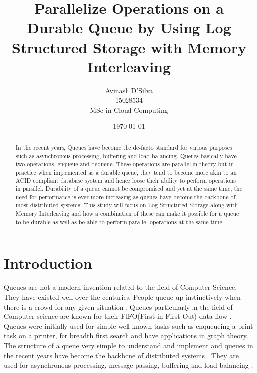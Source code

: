 \documentclass[12pt,a4paper]{article}
\begin{document}
\title{Parallelize Operations on a Durable Queue by Using Log Structured Storage with Memory Interleaving}%
\author{Avinash D'Silva \\ 15028534 \\ MSc in Cloud Computing}%
\date{\today}
\maketitle

\begin{abstract}
In the recent years, Queues have become the de-facto standard for various purposes such as asynchronous processing, buffering and load balancing. Queues basically have two operations, enqueue and dequeue. These operations are parallel in theory but in practice when implemented as a durable queue, they tend to become more akin to an ACID compliant database system and hence loose their ability to perform operations in parallel. Durability of a queue cannot be compromised and yet at the same time, the need for performance is ever more increasing as queues have become the backbone of most distributed systems. This study will focus on Log Structured Storage along with Memory Interleaving and how a combination of these can make it possible for a queue to be durable as well as be able to perform parallel operations at the same time.
\end{abstract}

\tableofcontents

\section{Introduction}

Queues are not a modern invention related to the field of Computer Science. They have existed well over the centuries. People queue up instinctively when there is a crowd for any given situation \citep{spieser2008stabilizing}. Queues particularly in the field of Computer science are known for their FIFO(First in First Out) data flow \citep{maclaren1969art}. Queues were initially used for simple well known tasks such as enqueueing a print task on a printer, for breadth first search and have applications in graph theory. \\

 The structure of a queue very simple to understand and implement and queues in the recent years have become the backbone of distributed systems \citep{lamport1978time}. They are used for asynchronous processing, message passing, buffering and load balancing \citep{lu2011join}. 
\end{document}
